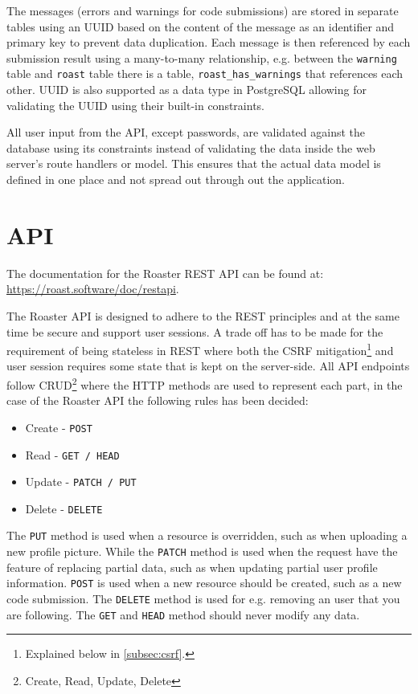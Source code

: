 \documentclass[12pt,a4paper]{report}
\begin{document}
\label{sec:database-messages}
The messages (errors and warnings for code submissions) are stored in separate tables using an UUID based on the content of the message as an identifier and primary key to prevent data duplication. Each message is then referenced by each submission result using a many-to-many relationship, e.g. between the \texttt{warning} table and \texttt{roast} table there is a table, \texttt{roast\_has\_warnings} that references each other. UUID is also supported as a data type in PostgreSQL\cite{pg-uuid} allowing for validating the UUID using their built-in constraints.

All user input from the API, except passwords, are validated against the database using its constraints instead of validating the data inside the web server's route handlers or model. This ensures that the actual data model is defined in one place and not spread out through out the application.

\section{API}
\label{sec:api-design}
The documentation for the Roaster REST API can be found at: \\ \url{https://roast.software/doc/restapi}.

The Roaster API is designed to adhere to the REST principles and at the same time be secure and support user sessions. A trade off has to be made for the requirement of being stateless in REST\cite{fielding-rest} where both the CSRF mitigation\footnote{Explained below in \autoref{subsec:csrf}.} and user session requires some state that is kept on the server-side. All API endpoints follow CRUD\footnote{Create, Read, Update, Delete} where the HTTP methods are used to represent each part, in the case of the Roaster API the following rules has been decided:
\begin{itemize}
    \item Create - \texttt{POST}
    \item Read - \texttt{GET / HEAD}
    \item Update - \texttt{PATCH / PUT}
    \item Delete - \texttt{DELETE}
\end{itemize}
The \texttt{PUT} method is used when a resource is overridden, such as when uploading a new profile picture. While the \texttt{PATCH} method is used when the request have the feature of replacing partial data, such as when updating partial user profile information. \texttt{POST} is used when a new resource should be created, such as a new code submission. The \texttt{DELETE} method is used for e.g. removing an user that you are following. The \texttt{GET} and \texttt{HEAD} method should never modify any data.
\end{document}
